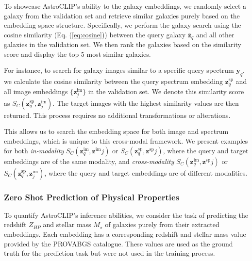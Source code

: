 \documentclass[draft, a4paper,12pt]{article}
\begin{document}
To showcase AstroCLIP's ability to the galaxy embeddings, we randomly select a galaxy from the validation set and retrieve similar galaxies purely based on the embedding space structure. Specifically, we perform the galaxy search using the cosine similarity (Eq. (\ref{eq:cosine})) between the query galaxy $\bar{\mathbf{z}}_q$ and all other galaxies in the validation set. We then rank the galaxies based on the similarity score and display the top 5 most similar galaxies.

For instance, to search for galaxy images similar to a specific query spectrum $\mathbf{y}_q$, we calculate the cosine similarity between the query spectrum embedding $\mathbf{z}^{\text{sp}}_q$ and all image embeddings $\{ \mathbf{z}^{\text{im}}_j \}$ in the validation set. We denote this similarity score as $S_C(\mathbf{z}^{\text{sp}}_q, \mathbf{z}^{\text{im}}_j)$. The target images with the highest similarity values are then returned. This process requires no additional transformations or alterations.

This allows us to search the embedding space for both image and spectrum embeddings, which is unique to this cross-modal framework. We present examples for both \emph{in-modality} $S_{C}(\mathbf{z}^{\text{im}}_q, \mathbf{z}^{\text{im}}j)$ or $S_{C}(\mathbf{z}^{\text{sp}}_q, \mathbf{z}^{\text{sp}}j)$, where the query and target embeddings are of the same modality, and \emph{cross-modality} $S_{C}(\mathbf{z}^{\text{im}}_q, \mathbf{z}^{\text{sp}}j)$ or $S_{C}(\mathbf{z}^{\text{sp}}_q, \mathbf{z}^{\text{im}}_j)$, where the query and target embeddings are of different modalities.





\subsubsection{Zero Shot Prediction of Physical Properties}
To quantify AstroCLIP's inference abilities, we consider the task of predicting the redshift $Z_{HP}$ and stellar mass $M_{\star}$ of galaxies purely from their extracted embeddings. Each embedding has a corresponding redshift and stellar mass value provided by the PROVABGS catalogue. These values are used as the ground truth for the prediction task but were not used in the training process.
\end{document}
